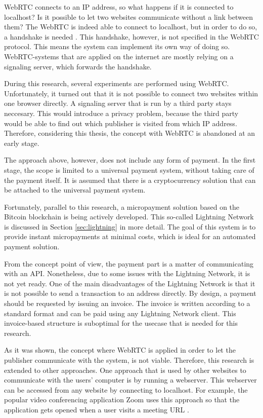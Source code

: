 WebRTC connects to an IP address, so what happens if it is connected to localhost? Is it possible to let two websites communicate without a link between them? The WebRTC is indeed able to connect to localhost, but in order to do so, a handshake is needed \cite{dutton2013webrtc}. This handshake, however, is not specified in the WebRTC protocol. This means the system can implement its own way of doing so. WebRTC-systems that are applied on the internet are mostly relying on a signaling server, which forwards the handshake. 

During this research, several experiments are performed using WebRTC. Unfortunately, it turned out that it is not possible to connect two websites within one browser directly. A signaling server that is run by a third party stays neccesary. This would introduce a privacy problem, because the third party would be able to find out which publisher is visited from which IP address. Therefore, considering this thesis, the concept with WebRTC is abandoned at an early stage.

The approach above, however, does not include any form of payment. In the first stage, the scope is limited to a universal payment system, without taking care of the payment itself. It is assumed that there is a cryptocurrency solution that can be attached to the universal payment system.

Fortunately, parallel to this research, a micropayment solution based on the Bitcoin block\-chain is being actively developed. This so-called Lightning Network is discussed in Section \ref{sec:lightning} in more detail. The goal of this system is to provide instant micropayments at minimal costs, which is ideal for an automated payment solution.

From the concept point of view, the payment part is a matter of communicating with an API. Nonetheless, due to some issues with the Lightning Network, it is not yet ready. One of the main disadvantages of the Lightning Network is that it is not possible to send a transaction to an address directly. By design, a payment should be requested by issuing an invoice. The invoice is written according to a standard format and can be paid using any Lightning Network client. This invoice-based structure is suboptimal for the usecase that is needed for this research.

As it was shown, the concept where WebRTC is applied in order to let the publisher communicate with the system, is not viable. Therefore, this research is extended to other approaches. One approach that is used by other websites to communicate with the users' computer is by running a webserver. This webserver can be accessed from any website by connecting to localhost. For example, the popular video conferencing application Zoom uses this approach so that the application gets opened when a user visits a meeting URL \cite{zoomwebserver}.

